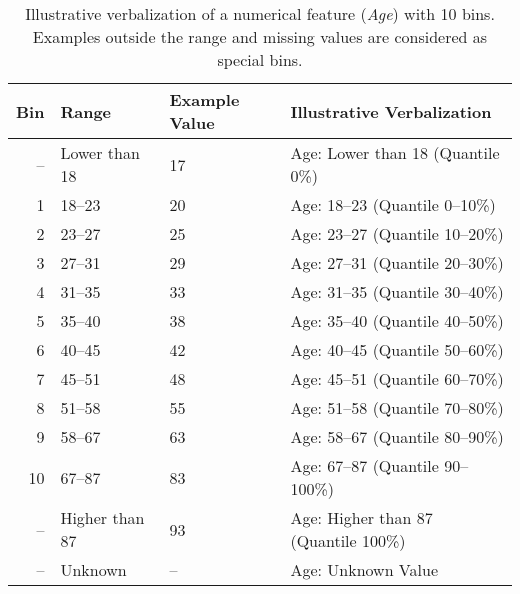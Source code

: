 \begin{table}[h]
\centering
\caption{Illustrative verbalization of a numerical feature (\textit{Age}) with 10 bins. Examples outside the range and missing values are considered as special bins.}
\begin{tabular}{rlll}
\toprule
\textbf{Bin} & \textbf{Range}        & \textbf{Example Value} & \textbf{Illustrative Verbalization}                          \\
\midrule
--  & Lower than 18      & 17                     & Age: Lower than 18 (Quantile 0\%)            \\
1  & 18–23              & 20                     & Age: 18–23 (Quantile 0–10\%)                     \\
2  & 23–27              & 25                     & Age: 23–27 (Quantile 10–20\%)                    \\
3  & 27–31              & 29                     & Age: 27–31 (Quantile 20–30\%)                    \\
4  & 31–35              & 33                     & Age: 31–35 (Quantile 30–40\%)                    \\
5  & 35–40              & 38                     & Age: 35–40 (Quantile 40–50\%)                    \\
6  & 40–45              & 42                     & Age: 40–45 (Quantile 50–60\%)                    \\
7  & 45–51              & 48                     & Age: 45–51 (Quantile 60–70\%)                    \\
8  & 51–58              & 55                     & Age: 51–58 (Quantile 70–80\%)                    \\
9  & 58–67              & 63                     & Age: 58–67 (Quantile 80–90\%)                    \\
10  & 67–87              & 83                     & Age: 67–87 (Quantile 90–100\%)                    \\
-- & Higher than 87     & 93                     & Age: Higher than 87 (Quantile 100\%)          \\
-- & Unknown            & –                      & Age: Unknown Value                               \\
\bottomrule
\end{tabular}
\label{tab:numerical_bin_verbalization}
\end{table}

